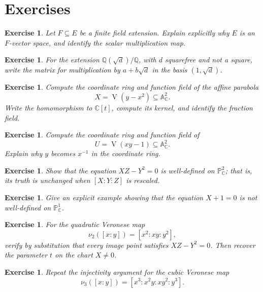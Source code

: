 \documentclass[11pt]{article}
\newtheorem{exercise}[theorem]{Exercise}
\theoremstyle{definition}
\theoremstyle{remark}
\newcommand{\A}{\mathbb{A}}
\newcommand{\C}{\mathbb{C}}
\newcommand{\Pj}{\mathbb{P}}
\newcommand{\Q}{\mathbb{Q}}
\newcommand{\V}{\operatorname{V}}
\begin{document}
\section{Exercises}

\begin{exercise}
Let \(F\subseteq E\) be a finite field extension.  Explain explicitly why
\(E\) is an \(F\)-vector space, and identify the scalar multiplication map.
\end{exercise}

\begin{exercise}
For the extension \(\Q(\sqrt d)/\Q\), with \(d\) squarefree and not a square,
write the matrix for multiplication by \(a+b\sqrt d\) in the basis
\((1,\sqrt d)\).
\end{exercise}

\begin{exercise}
Compute the coordinate ring and function field of the affine parabola
\[
  X=\V(y-x^2)\subseteq \A^2_{\C}.
\]
Write the homomorphism to \(\C[t]\), compute its kernel, and identify the
fraction field.
\end{exercise}

\begin{exercise}
Compute the coordinate ring and function field of
\[
  U=\V(xy-1)\subseteq \A^2_{\C}.
\]
Explain why \(y\) becomes \(x^{-1}\) in the coordinate ring.
\end{exercise}

\begin{exercise}
Show that the equation \(XZ-Y^2=0\) is well-defined on \(\Pj^2_{\C}\); that
is, its truth is unchanged when \([X:Y:Z]\) is rescaled.
\end{exercise}

\begin{exercise}
Give an explicit example showing that the equation \(X+1=0\) is not
well-defined on \(\Pj^1_{\C}\).
\end{exercise}

\begin{exercise}
For the quadratic Veronese map
\[
  \nu_2([x:y])=[x^2:xy:y^2],
\]
verify by substitution that every image point satisfies \(XZ-Y^2=0\).  Then
recover the parameter \(t\) on the chart \(X\neq 0\).
\end{exercise}

\begin{exercise}
Repeat the injectivity argument for the cubic Veronese map
\[
  \nu_3([x:y])=[x^3:x^2y:xy^2:y^3].
\]
\end{exercise}
\end{document}
